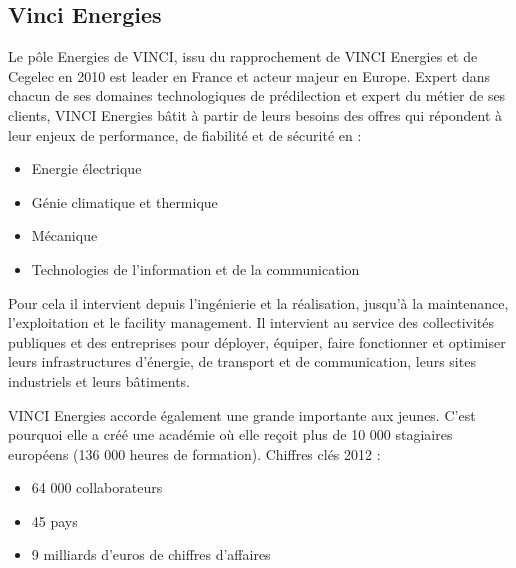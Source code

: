     \subsection{Vinci Energies}
    	Le pôle Energies de VINCI, issu du rapprochement de VINCI Energies et de Cegelec en 2010 est leader en France et acteur majeur en Europe.
    	Expert dans chacun de ses domaines technologiques de prédilection et expert du métier de ses clients, VINCI Energies bâtit à partir de leurs besoins des offres qui répondent à leur enjeux de performance, de fiabilité et de sécurité en :
    \begin{itemize}
    	\item Energie électrique
    	\item Génie climatique et thermique
    	\item Mécanique
    	\item Technologies de l'information et de la communication
    \end{itemize}
    \bigbreak
    	Pour cela il intervient depuis l'ingénierie et la réalisation, jusqu'à la maintenance, l'exploitation et le facility management. Il intervient au service des collectivités publiques et des entreprises pour déployer, équiper, faire fonctionner et optimiser leurs infrastructures d'énergie, de transport et de communication, leurs sites industriels et leurs bâtiments.

	VINCI Energies accorde également une grande importante aux jeunes. C'est pourquoi elle a créé une académie où elle reçoit plus de 10 000 stagiaires européens (136 000 heures de formation).
    \newpage
    Chiffres clés 2012 :
    \begin{itemize}
    	\item 64 000 collaborateurs
    	\item 45 pays
    	\item 9 milliards d'euros de chiffres d'affaires
    \end{itemize}

